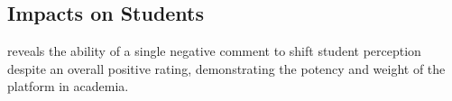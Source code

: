 \documentclass[man,12pt]{apa7}
\begin{document}
\subsection*{Impacts on Students}
\textcite{scherr_single_2013} reveals the ability of a single negative comment to shift student perception despite an overall positive rating, demonstrating the potency and weight of the platform in academia.










\end{document}
